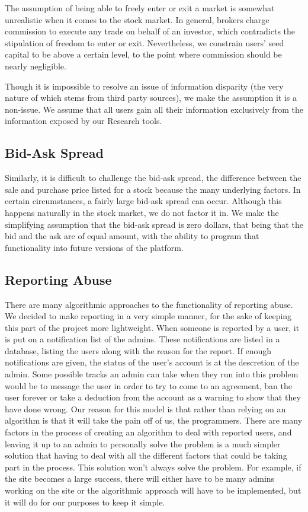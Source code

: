 The assumption of being able to freely enter or exit a market is somewhat unrealistic when it comes to the stock market. In general, brokers charge commission to execute any trade on behalf of an investor, which contradicts the stipulation of freedom to enter or exit. Nevertheless, we constrain users' seed capital to be above a certain level, to the point where commission should be nearly negligible.

Though it is impossible to resolve an issue of information disparity (the very nature of which stems from third party sources), we make the assumption it is a non-issue. We assume that all users gain all their information exclusively from the information exposed by our Research tools. 

\subsection{Bid-Ask Spread}

Similarly, it is difficult to challenge the bid-ask spread, the difference between the sale and purchase price listed for a stock because the many underlying factors. \cite{inv:spreaddet} In certain circumstances, a fairly large bid-ask spread can occur. Although this happens naturally in the stock market, we do not factor it in. We make the simplifying assumption that the bid-ask spread is zero dollars, that being that the bid and the ask are of equal amount, with the ability to program that functionality into future versions of the platform. 

\subsection{Reporting Abuse}

There are many algorithmic approaches to the functionality of reporting abuse. We decided to make reporting in a very simple manner, for the sake of keeping this part of the project more lightweight. When someone is reported by a user, it is put on a notification list of the admins. These notifications are listed in a database, listing the users along with the reason for the report. If enough notifications are given, the status of the user's account is at the descretion of the admin. Some possible tracks an admin can take when they run into this problem would be to message the user in order to try to come to an agreement, ban the user forever or take a deduction from the account as a warning to show that they have done wrong. Our reason for this model is that rather than relying on an algorithm is that it will take the pain off of us, the programmers. There are many factors in the process of creating an algorithm to deal with reported users, and leaving it up to an admin to personally solve the problem is a much simpler solution that having to deal with all the different factors that could be taking part in the process. This solution won't always solve the problem. For example, if the site becomes a large success, there will either have to be many admins working on the site or the algorithmic approach will have to be implemented, but it will do for our purposes to keep it simple.

